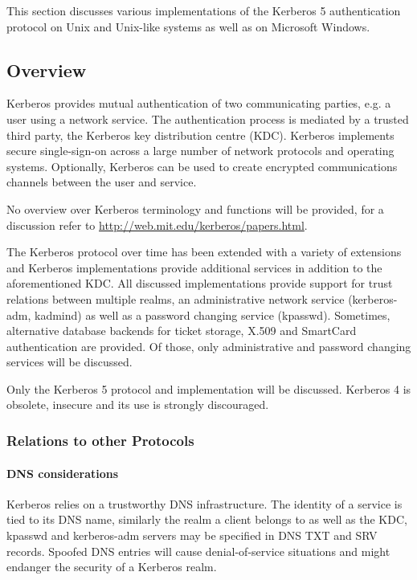 This section discusses various implementations of the Kerberos 5 authentication protocol
on Unix and Unix-like systems as well as on Microsoft Windows. 

\subsection{Overview}
\label{subsection:kerberos_overview}

Kerberos provides mutual authentication of two communicating parties, e.g. a user using a network service. The authentication process is mediated by a trusted third party, the Kerberos key distribution centre (KDC). Kerberos implements secure single-sign-on across a large number of network protocols and operating systems. Optionally, Kerberos can be used to create encrypted communications channels between the user and service.

No overview over Kerberos terminology and functions will be provided, for a discussion refer to \url{http://web.mit.edu/kerberos/papers.html}.


The Kerberos protocol over time has been extended with a variety of extensions and Kerberos implementations provide additional services in addition to the aforementioned KDC. All discussed implementations provide support for trust relations between multiple realms, an administrative network service (kerberos-adm, kadmind) as well as a password changing service (kpasswd). Sometimes, alternative database backends for ticket storage, X.509 and SmartCard authentication are provided. Of those, only administrative and password changing services will be discussed.

Only the Kerberos 5 protocol and implementation will be discussed. Kerberos 4 is obsolete, insecure and its use is strongly discouraged.

\subsubsection{Relations to other Protocols}
\label{subsubsection:kerberos_relation_to_other_protocols}

\paragraph{DNS considerations}
Kerberos relies on a trustworthy DNS infrastructure. The identity of a service is tied to its DNS name, similarly the realm a client belongs to as well as the KDC, kpasswd and kerberos-adm servers may be specified in DNS TXT and SRV records. Spoofed DNS entries will cause denial-of-service situations and might endanger the security of a Kerberos realm.


